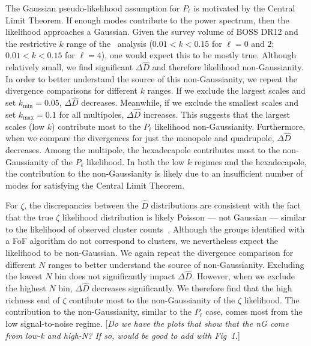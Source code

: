 \documentclass[12pt, letterpaper, preprint]{aastex}
\newcommand{\Beut}{\citetalias{beutler2017}\xspace}
\newcommand{\ms}[1]{{\color{orange}{\bf MS:}} {[\em #1}]}
\begin{document}
The Gaussian pseudo-likelihood assumption for $P_\ell$ is motivated 
by the Central Limit Theorem. If enough modes contribute to the 
power spectrum, then the likelihood approaches a Gaussian. Given the 
survey volume of BOSS DR12 and the restrictive $k$ range of the \Beut~analysis 
($0.01 < k < 0.15$ for $\ell = 0$ and $2$; $0.01 < k < 0.15$ for $\ell = 4$), 
one would expect this to be mostly true. Although relatively small, we
find significant $\Delta \widehat{D}$ and therefore likelihood non-Gaussianity. 
In order to better understand the source of this non-Gaussianity, 
we repeat the divergence comparisons for different $k$ ranges. If we 
exclude the largest scales and set $k_\mathrm{min} = 0.05$, $\Delta \widehat{D}$ 
decreases. Meanwhile, if we exclude the smallest scales and set 
$k_\mathrm{max} = 0.1$ for all 
multipoles, $\Delta \widehat{D}$ increases. This suggests that the largest 
scales (low $k$) contribute most to the $P_\ell$ likelihood non-Gaussianity.
Furthermore, when we compare the divergences for just the monopole and quadrupole, 
$\Delta \widehat{D}$ decreases. Among the multipole, the hexadecapole 
contributes most to the non-Gaussianity of the $P_\ell$ likelihood. 
In both the low $k$ regimes and the hexadecapole, the contribution to 
the non-Gaussianity is likely due to an insufficient number of modes 
for satisfying the Central Limit Theorem.

For $\zeta$, the discrepancies between the $\widehat{D}$ distributions 
are consistent with the fact that the true $\zeta$ likelihood 
distribution is likely Poisson --- not Gaussian --- similar to the likelihood 
of observed cluster counts~\citep{cash1979,planckcollaboration2014,ade2016}. 
Although the groups identified with a FoF algorithm do not correspond
to clusters, we nevertheless expect the likelihood to be non-Gaussian. 
We again repeat the divergence comparison for different $N$ ranges 
to better understand the source of non-Gaussianity. Excluding the 
lowest $N$ bin does not significantly impact $\Delta \widehat{D}$. However, 
when we exclude the highest $N$ bin, $\Delta \widehat{D}$ decreases significantly. 
We therefore find that the high richness end of $\zeta$ contibute most to 
the non-Gaussianity of the $\zeta$ likelihood. The contribution to the 
non-Gaussianity, similar to the $P_\ell$ case, comes most from the low 
signal-to-noise regime. \ms{Do we have the plots that show that the nG
  come from low-k and high-N? If so, would be good to add with Fig~1.}
\end{document}
